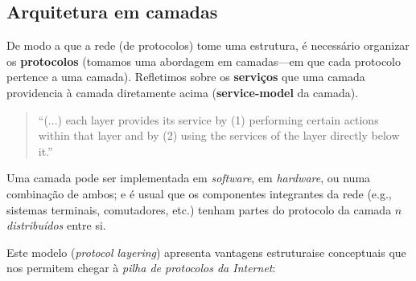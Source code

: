 \clearpage
\subsection[1.4 Arquitetura em camadas]{\hspace*{0.075 em}\raisebox{0.2 em}{$\pmb{\drsh}$} Arquitetura em camadas}
\label{subsec:arquitetura-em-camadas}

De modo a que a rede (de protocolos) tome uma estrutura, é necessário organizar os \textbf{protocolos} (tomamos uma abordagem em camadas---em que cada protocolo pertence a uma camada). Refletimos sobre os \textbf{serviços} que uma camada providencia à camada diretamente acima (\textbf{service-model} da camada).

\begin{quote}
    ``(...) each layer provides its service by (1) performing certain actions within that layer and by (2) using the services of the layer directly below it.''\cite{Kurose2017}
\end{quote}

\noindent Uma camada pode ser implementada em \textit{software}, em \textit{hardware}, ou numa combinação de ambos; e é usual que os componentes integrantes da rede (e.g., sistemas terminais, comutadores, etc.) tenham partes do protocolo da camada $n$ \textit{distribuídos} entre si.

Este modelo (\textit{protocol layering}) apresenta vantagens estruturais\footnotemark[2] e conceptuais que nos permitem chegar à \textit{pilha de protocolos da Internet}:

